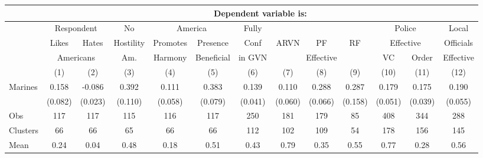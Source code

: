 \begin{tabular}{lcccccccccccc}
\hline  & \multicolumn{12}{c}{Dependent variable is:}\\
\hline  & \multicolumn{2}{c}{Respondent} & No & \multicolumn{2}{c}{America} & Fully &  &  &  & \multicolumn{2}{c}{Police} & Local\\
 & Likes & Hates & Hostility & Promotes & Presence & Conf & ARVN & PF & RF & \multicolumn{2}{c}{Effective} & Officials\\
 & \multicolumn{2}{c}{Americans} & Am. & Harmony & Beneficial & in GVN & \multicolumn{3}{c}{Effective} & VC & Order & Effective\\
 & (1) & (2) & (3) & (4) & (5) & (6) & (7) & (8) & (9) & (10) & (11) & (12)\\
\hline Marines & 0.158 & -0.086 & 0.392 & 0.111 & 0.383 & 0.139 & 0.110 & 0.288 & 0.287 & 0.179 & 0.175 & 0.190\\
 & (0.082) & (0.023) & (0.110) & (0.058) & (0.079) & (0.041) & (0.060) & (0.066) & (0.158) & (0.051) & (0.039) & (0.055)\\
Obs & 117 & 117 & 115 & 116 & 117 & 250 & 181 & 179 & 85 & 408 & 344 & 288\\
Clusters & 66  & 66  & 65  & 66  & 66  & 112  & 102  & 109  & 54  & 178  & 156  & 145 \\
Mean & 0.24 & 0.04 & 0.48 & 0.18 & 0.51 & 0.43 & 0.79 & 0.35 & 0.55 & 0.77 & 0.28 & 0.56\\
\hline\end{tabular}\\
